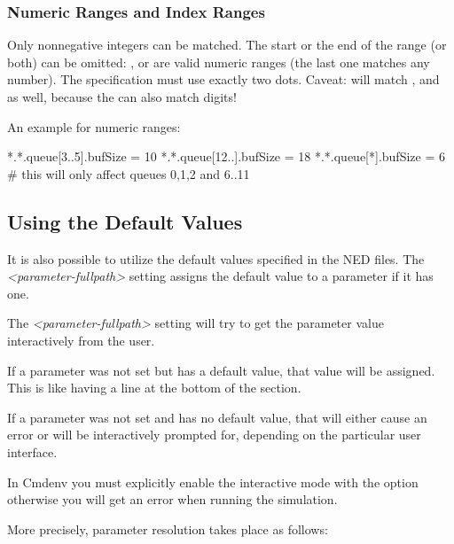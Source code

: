 \subsubsection{Numeric Ranges and Index Ranges}

Only nonnegative integers can be matched.  The start or the end of the range
(or both) can be omitted: ,  or 
are valid numeric ranges (the last one matches any number).
The specification must use exactly two dots.
Caveat:  will match ,  and  as well,
because the \ttt{*} can also match digits!

An example for numeric ranges:

\begin{inifile}
[General]
*.*.queue[3..5].bufSize = 10
*.*.queue[12..].bufSize = 18
*.*.queue[*].bufSize = 6  # this will only affect queues 0,1,2 and 6..11
\end{inifile}


\subsection{Using the Default Values}

It is also possible to utilize the default values specified in the NED files.
The \textit{<parameter-fullpath>} setting assigns
the default value to a parameter if it has one.

The \textit{<parameter-fullpath>} setting will try to get the parameter
value interactively from the user.

If a parameter was not set but has a default value, that value will be
assigned. This is like having a  line at the
bottom of the \ttt{[General]} section.

If a parameter was not set and has no default value, that will either
cause an error or will be interactively prompted for, depending
on the particular user interface.

\begin{note}
In Cmdenv you must explicitly enable the interactive mode with the
 option otherwise you will get an error
when running the simulation.
\end{note}

More precisely, parameter resolution takes place as follows:

